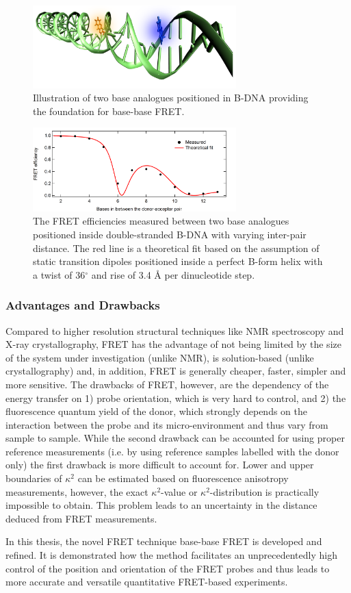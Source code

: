 \begin{figure}
    \centering
        \includegraphics[width=0.7\textwidth]{adds//basefret.png}
    \captionsetup{width=.95\textwidth}
    \caption{Illustration of two base analogues positioned in B-DNA providing the foundation for base-base FRET.}
    \label{Fig:chap_intro_basefret}
\end{figure}
\begin{figure}
    \centering
        \includegraphics[width=0.7\textwidth]{adds//basefretgraph.png}
    \captionsetup{width=.95\textwidth}
    \caption{The FRET efficiencies measured between two base analogues positioned inside double-stranded B-DNA with varying inter-pair distance.\cite{Borjesson2009a} The red line is a theoretical fit based on the assumption of static transition dipoles positioned inside a perfect B-form helix with a twist of 36$^\circ$ and rise of 3.4 Å per dinucleotide step.}
    \label{Fig:chap_intro_basefretgraph}
\end{figure}

\subsubsection{Advantages and Drawbacks}
 Compared to higher resolution structural techniques like NMR spectroscopy\cite{Foster2007} and X-ray crystallography\cite{Holbrook2008}, FRET has the advantage of not being limited by the size of the system under investigation (unlike NMR), is solution-based (unlike crystallography) and, in addition, FRET is generally cheaper, faster, simpler and more sensitive. The drawbacks of FRET, however, are the dependency of the energy transfer on 1) probe orientation, which is very hard to control, and 2) the fluorescence quantum yield of the donor, which strongly depends on the interaction between the probe and its micro-environment and thus vary from sample to sample. While the second drawback can be accounted for using proper reference measurements (i.e. by using reference samples labelled with the donor only) the first drawback is more difficult to account for. Lower and upper boundaries of $\kappa^2$ can be estimated based on fluorescence anisotropy measurements\cite{Dale1974,Dale1979}, however, the exact $\kappa^2$-value or $\kappa^2$-distribution is practically impossible to obtain. This problem leads to an uncertainty in the distance deduced from FRET measurements.

 In this thesis, the novel FRET technique base-base FRET is developed and refined. It is demonstrated how the method facilitates an unprecedentedly high control of the position and orientation of the FRET probes and thus leads to more accurate and versatile quantitative FRET-based experiments.


